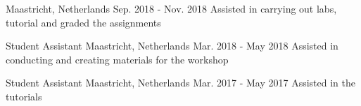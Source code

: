 \begin{cventries}
{Maastricht, Netherlands}
{Sep. 2018 - Nov. 2018}
{Assisted in carrying out labs, tutorial and graded the assignments}

{Student Assistant}
{Maastricht, Netherlands}
{Mar. 2018 - May 2018}
{Assisted in conducting and creating materials for the workshop}

{Student Assistant}
{Maastricht, Netherlands}
{Mar. 2017 - May 2017}
{Assisted in the tutorials}
\end{cventries}